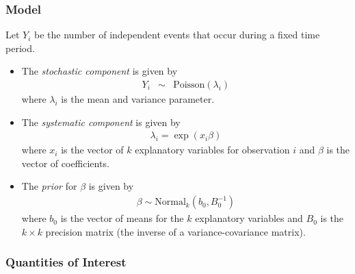 \subsubsection{Model}

Let $Y_{i}$ be the number of independent events that occur during 
a fixed time period. 
\begin{itemize}
\item The \emph{stochastic component} is given by
\begin{eqnarray*}
Y_{i}  &  \sim & \textrm{Poisson}(\lambda_i)
\end{eqnarray*}
where $\lambda_i$ is the mean and variance parameter.

\item The \emph{systematic component} is given by
\begin{eqnarray*}
\lambda_{i}= \exp(x_{i} \beta)
\end{eqnarray*}
where $x_{i}$ is the vector of $k$ explanatory variables for observation $i$
and $\beta$ is the vector of coefficients.

\item The \emph{prior} for $\beta$ is given by
\begin{eqnarray*}
\beta \sim \textrm{Normal}_k \left(  b_{0},B_{0}^{-1}\right)
\end{eqnarray*}
where $b_{0}$ is the vector of means for the $k$ explanatory variables
and $B_{0}$ is the $k \times k$ precision matrix (the inverse of a
variance-covariance matrix).
\end{itemize}

\subsubsection{Quantities of Interest}

